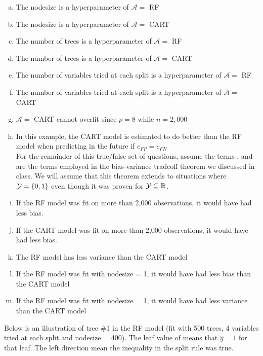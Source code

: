 \documentclass[12pt]{article}
\begin{document}
\begin{enumerate}[(a)]
\item The nodesize is a hyperparameter of $\mathcal{A} =$ RF
\item The nodesize is a hyperparameter of $\mathcal{A} =$ CART
\item The number of trees is a hyperparameter of $\mathcal{A} =$ RF
\item The number of trees is a hyperparameter of $\mathcal{A} =$ CART
\item The number of variables tried at each split is a hyperparameter of $\mathcal{A} =$ RF
\item The number of variables tried at each split is a hyperparameter of $\mathcal{A} =$ CART
\item $\mathcal{A} =$ CART cannot overfit since $p=8$ while $n=2,000$
\item In this example, the CART model is estimated to do better than the RF model when predicting in the future if $c_{FP} = c_{FN}$\\

For the remainder of this true/false set of questions, assume the terms ,  and  are the terms employed in the bias-variance tradeoff theorem we discussed in class. We will assume that this theorem extends to situations where $\mathcal{Y} = \left\{0,1\right\}$ even though it was proven for $\mathcal{Y} \subseteq \mathbb{R}$.

\item If the RF model was fit on more than 2,000 observations, it would have had less bias.
\item If the CART model was fit on more than 2,000 observations, it would have had less bias.
\item The RF model has less variance than the CART model

\item If the RF model was fit with nodesize = 1, it would have had less bias than the CART model
\item If the RF model was fit with nodesize = 1, it would have had less variance than the CART model
\end{enumerate}

Below is an illustration of tree \#1 in the RF model (fit with 500 trees, 4 variables tried at each split and nodesize = 400). The leaf value of  means that $\hat{y} = 1$ for that leaf. The left direction mean the inequality in the split rule was true.
\end{document}
